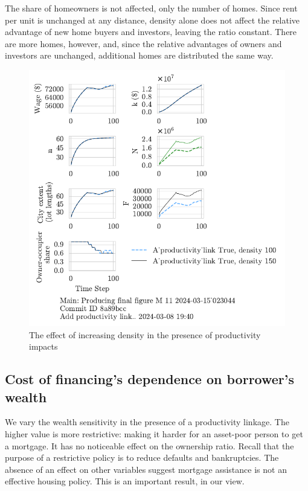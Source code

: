 The share of homeowners is not affected, only the number of homes. Since rent per unit is unchanged at any distance, density alone does not affect the relative advantage of new home buyers and investors, leaving the ratio constant. There are more homes, however, and, since the relative advantages of owners and investors are unchanged, additional homes are distributed the same way.  

\begin{figure}[h!bt]
    \centering
    \includegraphics[scale=1, trim={0 1.4cm 0 0},clip]{fig/With-productivity_link-density-023044.pdf}
    \caption{The effect of increasing density in the presence of productivity impacts}
    \label{fig:Productivity_link_and_density_ownership_trajectory}
\end{figure}


\newpage
\subsection{Cost of financing's dependence on borrower's wealth}
We vary the wealth sensitivity in the presence of a productivity linkage. The higher value is more restrictive:  making it harder for an asset-poor person to get a mortgage. It has no noticeable effect on the ownership ratio. Recall that the purpose of a restrictive policy is to reduce defaults and bankruptcies. The absence of an effect on other variables suggest mortgage assistance is not an effective housing policy.  This is an important result, in our view.

